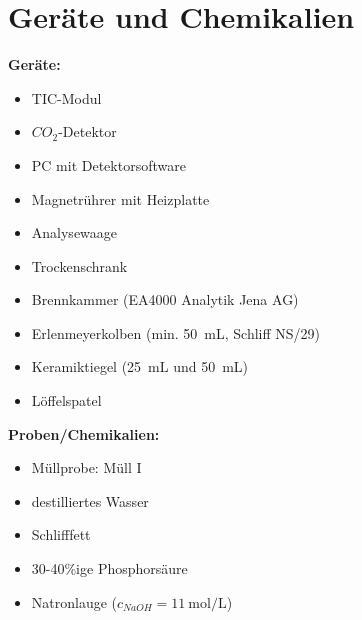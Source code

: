\chapter{Geräte und Chemikalien}
\label{sec:geraete}

\textbf{Geräte:}
\begin{itemize}
	\item TIC-Modul
	\item $CO_2$-Detektor
	\item PC mit Detektorsoftware
	\item Magnetrührer mit Heizplatte
	\item Analysewaage
	\item Trockenschrank
	\item Brennkammer (EA4000 Analytik Jena AG)
	\item Erlenmeyerkolben (min. \SI{50}{\milli \liter}, Schliff NS/29)
	\item Keramiktiegel (\SI{25}{\milli \liter} und \SI{50}{\milli \liter})
	\item Löffelspatel
\end{itemize}

\vspace*{5mm}

\textbf{Proben/Chemikalien:}
\begin{itemize}
	\item Müllprobe: Müll I
	\item destilliertes Wasser
	\item Schlifffett
	\item 30-40\%ige Phosphorsäure
	\item Natronlauge ($c_{NaOH}=\SI{11}{\mole \per \liter}$)
\end{itemize}


